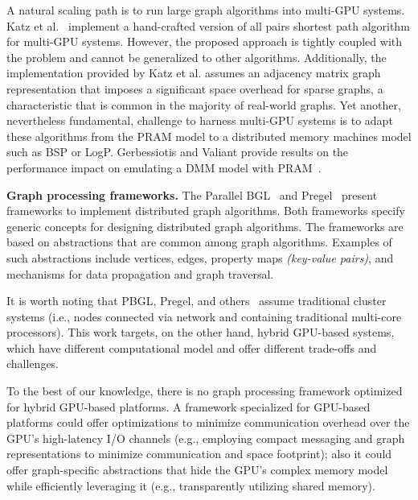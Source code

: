 A natural scaling path is to run large graph algorithms into multi-GPU systems. Katz et al.~\cite{Katz2008} implement a hand-crafted version of all pairs shortest path algorithm for multi-GPU systems. However, the proposed approach is tightly coupled with the problem and cannot be generalized to other algorithms. Additionally, the implementation provided by Katz et al. assumes an adjacency matrix graph representation that imposes a significant space overhead for sparse graphs, a characteristic that is common in the majority of real-world graphs. Yet another, nevertheless fundamental, challenge to harness multi-GPU systems is to adapt these algorithms from the PRAM model to a distributed memory machines model such as BSP or LogP. Gerbessiotis and Valiant provide results on the performance impact on emulating a DMM model with PRAM~\cite{Gerbessiotis92}. 

{\bf Graph processing frameworks.} The Parallel BGL~\cite{gregor2005parallel} and Pregel~\cite{Malewicz2009} present frameworks to implement distributed graph algorithms. Both frameworks specify generic concepts for designing distributed graph algorithms. The frameworks are based on abstractions that are common among graph algorithms. Examples of such abstractions include vertices, edges, property maps {\em (key-value pairs)}, and mechanisms for data propagation and graph traversal. 

It is worth noting that PBGL, Pregel, and others~\cite{Zhao2009} assume traditional cluster systems (i.e., nodes connected via network and containing traditional multi-core processors). This work targets, on the other hand, hybrid GPU-based systems, which have different computational model and offer different trade-offs and challenges. 

To the best of our knowledge, there is no graph processing framework optimized for hybrid GPU-based platforms. A framework specialized for GPU-based platforms could offer optimizations to minimize communication overhead over the GPU's high-latency I/O channels (e.g., employing compact messaging and graph representations to minimize communication and space footprint); also it could offer graph-specific abstractions that hide the GPU's complex memory model while efficiently leveraging it (e.g., transparently utilizing shared memory). 

